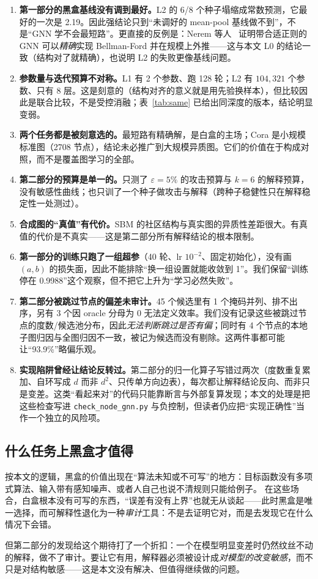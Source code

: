 \begin{enumerate}[leftmargin=1.8em]
\item \textbf{第一部分的黑盒基线没有调到最好。}L2 的 6/8 个种子塌缩成常数预测，它最好的一次是 2.19。因此强结论只到“未调好的 mean-pool 基线做不到”，不是“GNN 学不会最短路”。更直接的反例是：Nerem 等人~\cite{nerem2025ood} 证明带合适正则的 GNN 可以\emph{精确}实现 Bellman-Ford 并在规模上外推——这与本文 L0 的结论一致（结构对了就精确），也说明 L2 的失败更像基线问题。
\item \textbf{参数量与迭代预算不对称。}L1 有 2 个参数、跑 128 轮；L2 有 $104{,}321$ 个参数、只有 8 层。这是刻意的（结构对齐的意义就是用先验换样本），但比较因此是联合比较，不是受控消融；表~\ref{tab:same} 已给出同深度的版本，结论明显变弱。
\item \textbf{两个任务都是被刻意选的。}最短路有精确解，是白盒的主场；Cora 是小规模标准图（2708 节点），结论未必推广到大规模异质图。它们的价值在于构成对照，而不是覆盖图学习的全部。
\item \textbf{第二部分的预算是单一的。}只测了 $\varepsilon=5\%$ 的攻击预算与 $k=6$ 的解释预算，没有敏感性曲线；也只训了一个种子做攻击与解释（跨种子稳健性只在解释稳定性一处测过）。
\item \textbf{合成图的“真值”有代价。}SBM 的社区结构与真实图的异质性差距很大。有真值的代价是不真实——这是第二部分所有解释结论的根本限制。
\item \textbf{第一部分的训练只跑了一组超参}（40 轮、lr $10^{-2}$、固定初始化），没有画 $(a,b)$ 的损失面，因此不能排除“换一组设置就能收敛到 1”。我们保留“训练停在 0.9988”这个观察，但不把它上升为“学习必然失败”。
\item \textbf{第二部分被跳过节点的偏差未审计。}45 个候选里有 1 个掩码并列、排不出序，另有 3 个因 oracle 分母为 0 无法定义效率。我们没有记录这些被跳过节点的度数/候选池分布，因此\emph{无法判断跳过是否有偏}；同时有 4 个节点的本地子图归因与全图归因不一致，被记为候选而没有剔除。这两件事都可能让“93.9\%”略偏乐观。
\item \textbf{实现陷阱曾经让结论反转过。}第二部分的归一化算子写错过两次（度数重复累加、自环写成 $d$ 而非 $d^2$、只传单方向边表），每次都让解释结论反向、而非只是变差。这类“看起来对”的代码只能靠断言与外部复算发现；本文的处理是把这些检查写进 \texttt{check\_node\_gnn.py} 与负控制，但读者仍应把“实现正确性”当作一个独立的风险项。
\end{enumerate}

\subsection{什么任务上黑盒才值得}

按本文的逻辑，黑盒的价值出现在“算法未知或不可写”的地方：目标函数没有多项式算法、输入带有感知噪声、或者人自己也说不清规则只能给例子。
在这些场合，白盒根本没有可写的东西，“误差有没有上界”也就无从谈起——此时黑盒是唯一选择，而可解释性退化为一种\emph{审计}工具：不是去证明它对，而是去发现它在什么情况下会错。

但第二部分的发现给这个期待打了一个折扣：一个在模型明显变差时仍然纹丝不动的解释，做不了审计。要让它有用，解释器必须被设计成\emph{对模型的改变敏感}，而不只是对结构敏感——这是本文没有解决、但值得继续做的问题。
